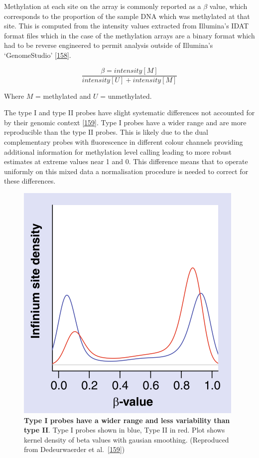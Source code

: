 \documentclass[
]{book}
\begin{document}
Methylation at each site on the array is commonly reported as a \(\beta\) value, which corresponds to the proportion of the sample DNA which was methylated at that site.
This is computed from the intensity values extracted from Illumina's IDAT format files which in the case of the methylation arrays are a binary format which had to be reverse engineered to permit analysis outside of Illumina's `GenomeStudio' {[}\protect\hyperlink{ref-Smith2013}{158}{]}.

\[\frac{\beta=intensity[M]}{intensity[U] + intensity[M]}\]

Where \(M\) = methylated and \(U\) = unmethylated.

The type I and type II probes have slight systematic differences not accounted for by their genomic context {[}\protect\hyperlink{ref-Dedeurwaerder2011}{159}{]}.
Type I probes have a wider range and are more reproducible than the type II probes.
This is likely due to the dual complementary probes with fluorescence in different colour channels providing additional information for methylation level calling leading to more robust estimates at extreme values near 1 and 0.
This difference means that to operate uniformly on this mixed data a normalisation procedure is needed to correct for these differences.

\begin{figure}

{\centering \includegraphics[width=0.5\linewidth]{figs/Dedeurwaerder2011fig1bL} 

}

\caption{\textbf{Type I probes have a wider range and less variability than type II}. Type I probes shown in blue, Type II in red. Plot shows kernel density of beta values with gausian smoothing. (Reproduced from Dedeurwaerder et al.~{[}\protect\hyperlink{ref-Dedeurwaerder2011}{159}{]})}\label{fig:Dedeurwaerder2011fig1bL}
\end{figure}
\end{document}
